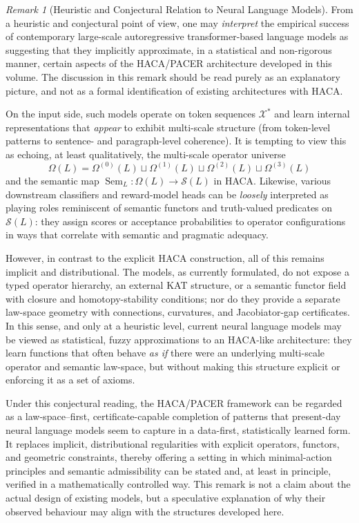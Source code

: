 \documentclass[11pt]{book}
\theoremstyle{plain}
\theoremstyle{definition}
\theoremstyle{remark}
\newtheorem{remark}[theorem]{Remark}
\begin{document}
\begin{remark}[Heuristic and Conjectural Relation to Neural Language Models]
\label{rem:haca-heuristic-neural-lm}
From a heuristic and conjectural point of view, one may \emph{interpret}
the empirical success of contemporary large-scale autoregressive
transformer-based language models as suggesting that they implicitly
approximate, in a statistical and non-rigorous manner, certain aspects of
the HACA/PACER architecture developed in this volume. The discussion in
this remark should be read purely as an explanatory picture, and not as a
formal identification of existing architectures with HACA.

On the input side, such models operate on token sequences
$\mathcal{X}^\ast$ and learn internal representations that \emph{appear}
to exhibit multi-scale structure (from token-level patterns to sentence-
 and paragraph-level coherence). It is tempting to view this as echoing,
at least qualitatively, the multi-scale operator universe
\[
  \Omega(L)
  =
  \Omega^{(0)}(L)\sqcup\Omega^{(1)}(L)
  \sqcup\Omega^{(2)}(L)\sqcup\Omega^{(3)}(L)
\]
and the semantic map
$\operatorname{Sem}_L:\Omega(L)\to\mathcal{S}(L)$ in HACA. Likewise,
various downstream classifiers and reward-model heads can be \emph{loosely}
interpreted as playing roles reminiscent of semantic functors and
truth-valued predicates on $\mathcal{S}(L)$: they assign scores or
acceptance probabilities to operator configurations in ways that correlate
with semantic and pragmatic adequacy.

However, in contrast to the explicit HACA construction, all of this
remains implicit and distributional. The models, as currently formulated,
do not expose a typed operator hierarchy, an external KAT structure, or a
semantic functor field with closure and homotopy-stability conditions; nor
do they provide a separate law-space geometry with connections, curvatures,
and Jacobiator-gap certificates. In this sense, and only at a heuristic
level, current neural language models may be viewed as statistical, fuzzy
approximations to an HACA-like architecture: they learn functions that
often behave \emph{as if} there were an underlying multi-scale operator
and semantic law-space, but without making this structure explicit or
enforcing it as a set of axioms.

Under this conjectural reading, the HACA/PACER framework can be regarded
as a law-space–first, certificate-capable completion of patterns that
present-day neural language models seem to capture in a data-first,
statistically learned form. It replaces implicit, distributional
regularities with explicit operators, functors, and geometric constraints,
thereby offering a setting in which minimal-action principles and semantic
admissibility can be stated and, at least in principle, verified in a
mathematically controlled way. This remark is not a claim about the actual
design of existing models, but a speculative explanation of why their
observed behaviour may align with the structures developed here.

\end{remark}
\end{document}
